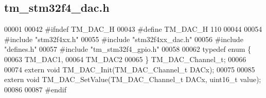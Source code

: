 \hypertarget{tm__stm32f4__dac_8h_source}{}\subsection{tm\+\_\+stm32f4\+\_\+dac.\+h}

\begin{DoxyCode}
00001 
00042 \textcolor{preprocessor}{#ifndef TM\_DAC\_H}
00043 \textcolor{preprocessor}{#define TM\_DAC\_H 110}
00044 
00054 \textcolor{preprocessor}{#include "stm32f4xx.h"}
00055 \textcolor{preprocessor}{#include "stm32f4xx\_dac.h"}
00056 \textcolor{preprocessor}{#include "defines.h"}
00057 \textcolor{preprocessor}{#include "tm\_stm32f4\_gpio.h"}
00058 
00062 \textcolor{keyword}{typedef} \textcolor{keyword}{enum} \{
00063     TM\_DAC1,
00064     TM\_DAC2
00065 \} TM\_DAC\_Channel\_t;
00066 
00074 \textcolor{keyword}{extern} \textcolor{keywordtype}{void} TM\_DAC\_Init(TM\_DAC\_Channel\_t DACx);
00075 
00085 \textcolor{keyword}{extern} \textcolor{keywordtype}{void} TM\_DAC\_SetValue(TM\_DAC\_Channel\_t DACx, uint16\_t value);
00086 
00087 \textcolor{preprocessor}{#endif}
\end{DoxyCode}
